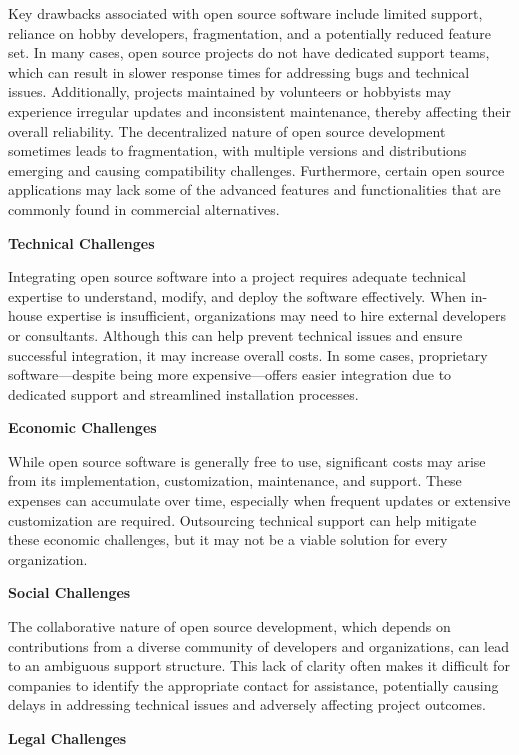 Key drawbacks associated with open source software include limited support, reliance on hobby developers, fragmentation, and a potentially reduced feature set. In many cases, open source projects do not have dedicated support teams, which can result in slower response times for addressing bugs and technical issues. Additionally, projects maintained by volunteers or hobbyists may experience irregular updates and inconsistent maintenance, thereby affecting their overall reliability. The decentralized nature of open source development sometimes leads to fragmentation, with multiple versions and distributions emerging and causing compatibility challenges. Furthermore, certain open source applications may lack some of the advanced features and functionalities that are commonly found in commercial alternatives.

\cite{OpenSource-Software-Risks-Disadvantages}


\textbf{Technical Challenges}

Integrating open source software into a project requires adequate technical expertise to understand, modify, and deploy the software effectively. When in-house expertise is insufficient, organizations may need to hire external developers or consultants. Although this can help prevent technical issues and ensure successful integration, it may increase overall costs. In some cases, proprietary software—despite being more expensive—offers easier integration due to dedicated support and streamlined installation processes.

\textbf{Economic Challenges}

While open source software is generally free to use, significant costs may arise from its implementation, customization, maintenance, and support. These expenses can accumulate over time, especially when frequent updates or extensive customization are required. Outsourcing technical support can help mitigate these economic challenges, but it may not be a viable solution for every organization.

\textbf{Social Challenges}

The collaborative nature of open source development, which depends on contributions from a diverse community of developers and organizations, can lead to an ambiguous support structure. This lack of clarity often makes it difficult for companies to identify the appropriate contact for assistance, potentially causing delays in addressing technical issues and adversely affecting project outcomes.

\textbf{Legal Challenges}

